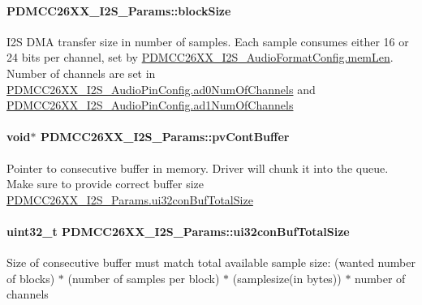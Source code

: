 \paragraph[{block\+Size}]{ P\+D\+M\+C\+C26\+X\+X\+\_\+\+I2\+S\+\_\+\+Params\+::block\+Size}\label{struct_p_d_m_c_c26_x_x___i2_s___params_a2e982ff324a5a27b0cefb2bb8687b6dc}
I2\+S D\+M\+A transfer size in number of samples. Each sample consumes either 16 or 24 bits per channel, set by \hyperlink{struct_p_d_m_c_c26_x_x___i2_s___audio_format_config_aa6310978bb3efcf50aab7226f34597b1}{P\+D\+M\+C\+C26\+X\+X\+\_\+\+I2\+S\+\_\+\+Audio\+Format\+Config.\+mem\+Len}. Number of channels are set in \hyperlink{union_p_d_m_c_c26_x_x___i2_s___audio_pin_config_aefb4fcc1a8af0204f4daf2dd82b6498a}{P\+D\+M\+C\+C26\+X\+X\+\_\+\+I2\+S\+\_\+\+Audio\+Pin\+Config.\+ad0\+Num\+Of\+Channels} and \hyperlink{union_p_d_m_c_c26_x_x___i2_s___audio_pin_config_aabec0b0c95bf1757afb8fd80e06ef515}{P\+D\+M\+C\+C26\+X\+X\+\_\+\+I2\+S\+\_\+\+Audio\+Pin\+Config.\+ad1\+Num\+Of\+Channels} 
\paragraph[{pv\+Cont\+Buffer}]{\setlength{\rightskip}{0pt plus 5cm}void$\ast$ P\+D\+M\+C\+C26\+X\+X\+\_\+\+I2\+S\+\_\+\+Params\+::pv\+Cont\+Buffer}\label{struct_p_d_m_c_c26_x_x___i2_s___params_a5298f177d4658f5322a28ef42dc0149d}
Pointer to consecutive buffer in memory. Driver will chunk it into the queue. Make sure to provide correct buffer size \hyperlink{struct_p_d_m_c_c26_x_x___i2_s___params_aa602775d0906685e522eb949562bf613}{P\+D\+M\+C\+C26\+X\+X\+\_\+\+I2\+S\+\_\+\+Params.\+ui32con\+Buf\+Total\+Size} 
\paragraph[{ui32con\+Buf\+Total\+Size}]{\setlength{\rightskip}{0pt plus 5cm}uint32\+\_\+t P\+D\+M\+C\+C26\+X\+X\+\_\+\+I2\+S\+\_\+\+Params\+::ui32con\+Buf\+Total\+Size}\label{struct_p_d_m_c_c26_x_x___i2_s___params_aa602775d0906685e522eb949562bf613}
Size of consecutive buffer must match total available sample size\+: (wanted number of blocks) $\ast$ (number of samples per block) $\ast$ (samplesize(in bytes)) $\ast$ number of channels 
